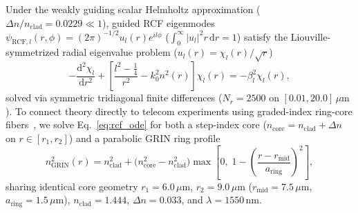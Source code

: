 \documentclass{optica-article}
\newcommand{\abs}[1]{\lvert #1 \rvert}
\newcommand{\dd}{\mathrm{d}}
\begin{document}
Under the weakly guiding scalar Helmholtz approximation ($\Delta n/n_{\mathrm{clad}} = 0.0229 \ll 1$), guided RCF eigenmodes $\psi_{\mathrm{RCF},l}(r,\phi) = (2\pi)^{-1/2} u_l(r) e^{il\phi}$ ($\int_0^\infty \abs{u_l}^2 r\,\dd r = 1$) satisfy the Liouville-symmetrized radial eigenvalue problem ($u_l(r) = \chi_l(r)/\sqrt{r}$)
\begin{equation}
  -\frac{\dd^2\chi_l}{\dd r^2} + \left[\frac{l^2 - \frac{1}{4}}{r^2} - k_0^2 n^2(r)\right]\chi_l(r) = -\beta_l^2\chi_l(r),
  \label{eq:rcf_ode}
\end{equation}
solved via symmetric tridiagonal finite differences ($N_r = 2500$ on $[0.01, 20.0]\,\mu\mathrm{m}$). To connect theory directly to telecom experiments using graded-index ring-core fibers~\cite{Zhang2018GRIN,Villalba2023}, we solve Eq.~\eqref{eq:rcf_ode} for both a step-index core ($n_{\mathrm{core}} = n_{\mathrm{clad}} + \Delta n$ on $r \in [r_1, r_2]$) and a parabolic GRIN ring profile
\begin{equation}
  n_{\mathrm{GRIN}}^2(r) = n_{\mathrm{clad}}^2 + \bigl(n_{\mathrm{core}}^2 - n_{\mathrm{clad}}^2\bigr)\max\!\left[0,\; 1 - \left(\frac{r - r_{\mathrm{mid}}}{a_{\mathrm{ring}}}\right)^2\right],
  \label{eq:grin_prof}
\end{equation}
sharing identical core geometry $r_1 = 6.0\,\mu\mathrm{m}$, $r_2 = 9.0\,\mu\mathrm{m}$ ($r_{\mathrm{mid}} = 7.5\,\mu\mathrm{m}$, $a_{\mathrm{ring}} = 1.5\,\mu\mathrm{m}$), $n_{\mathrm{clad}} = 1.444$, $\Delta n = 0.033$, and $\lambda = 1550\,\mathrm{nm}$.
\end{document}
